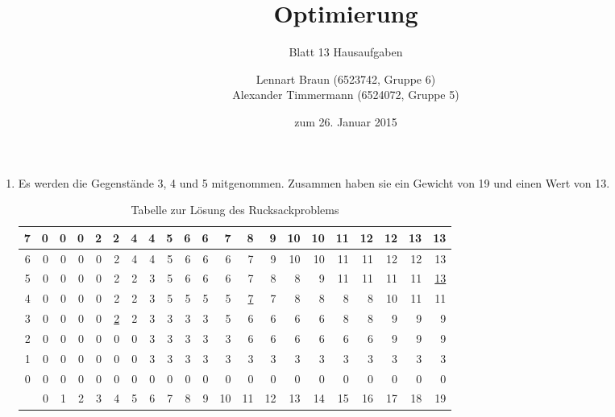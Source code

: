 \documentclass[a4paper]{scrartcl}
\title{Optimierung}
\subtitle{Blatt 13 Hausaufgaben}
\author{
	Lennart Braun (6523742, Gruppe 6) \\
    Alexander Timmermann (6524072, Gruppe 5)
}
\date{zum 26. Januar 2015}
\begin{document}
\maketitle

\begin{enumerate}[label=\bfseries\arabic*.]
    \item
        Es werden die Gegenstände 3, 4 und 5 mitgenommen.
        Zusammen haben sie ein Gewicht von 19 und einen Wert von 13.
        \begin{table}[h]
            \centering
            \begin{tabular}{r|r|r|r|r|r|r|r|r|r|r|r|r|r|r|r|r|r|r|r|r|}
                \hline
                7 & 0 & 0 & 0 & 2 & 2 & 4 & 4 & 5 & 6 & 6 &  7 &  8 &  9 & 10 & 10 & 11 & 12 & 12 & 13 & 13 \\ \hline
                6 & 0 & 0 & 0 & 0 & 2 & 4 & 4 & 5 & 6 & 6 &  6 &  7 &  9 & 10 & 10 & 11 & 11 & 12 & 12 & 13 \\ \hline
                5 & 0 & 0 & 0 & 0 & 2 & 2 & 3 & 5 & 6 & 6 &  6 &  7 &  8 &  8 &  9 & 11 & 11 & 11 & 11 & \underline{13} \\ \hline
                4 & 0 & 0 & 0 & 0 & 2 & 2 & 3 & 5 & 5 & 5 &  5 &  \underline{7} &  7 &  8 &  8 &  8 &  8 & 10 & 11 & 11 \\ \hline
                3 & 0 & 0 & 0 & 0 & \underline{2} & 2 & 3 & 3 & 3 & 3 &  5 &  6 &  6 &  6 &  6 &  8 &  8 &  9 &  9 &  9 \\ \hline
                2 & 0 & 0 & 0 & 0 & 0 & 0 & 3 & 3 & 3 & 3 &  3 &  6 &  6 &  6 &  6 &  6 &  6 &  9 &  9 &  9 \\ \hline
                1 & 0 & 0 & 0 & 0 & 0 & 0 & 3 & 3 & 3 & 3 &  3 &  3 &  3 &  3 &  3 &  3 &  3 &  3 &  3 &  3 \\ \hline
                0 & 0 & 0 & 0 & 0 & 0 & 0 & 0 & 0 & 0 & 0 &  0 &  0 &  0 &  0 &  0 &  0 &  0 &  0 &  0 &  0 \\ \hline
                  & 0 & 1 & 2 & 3 & 4 & 5 & 6 & 7 & 8 & 9 & 10 & 11 & 12 & 13 & 14 & 15 & 16 & 17 & 18 & 19 \\
            \end{tabular}
            \caption{Tabelle zur Lösung des Rucksackproblems}
            \label{tab:rucksack}
        \end{table}


\end{enumerate}
\end{document}
